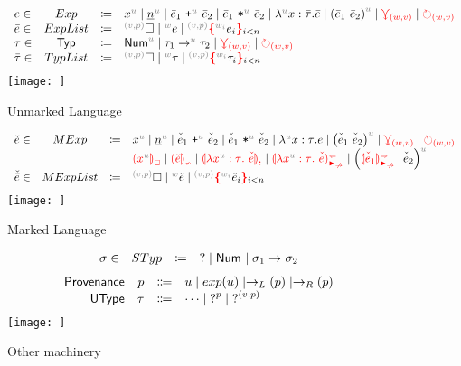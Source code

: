 \begin{figure}
    \[
    \begin{array}{lclll}
     \EMV \in & Exp & \coloneqq & 
        \var{x}
        \mid  \num 
        \mid \plus{\ELV_1}{\ELV_2} 
        \mid \mult{\ELV_1}{\ELV_2}
        \mid \lam{x}{\TLMV}{\ELV}
        \mid \app{\ELV_1}{\ELV_2}
        \mid \multiref
        \mid \uniref \\
     \ELV \in & ExpList & \coloneqq & 
        \ehole
        \mid \lexp{\EMV} 
        \mid \conflict{\EMV} \\
    \TMV \in & \Typ & \coloneqq & 
        \tnum 
        \mid \tarrow 
        \mid \multiref 
        \mid \uniref \\ 
    \TLMV \in & TypList & \coloneqq &
        \ehole
        \mid \lexp{\TMV}
        \mid \conflict{\TMV} \\
    \end{array}
    \]
    \centering
    \texttt{[image: ]}
    \caption{Unmarked Language}
    \label{fig:unmarked-language}
\end{figure}

\begin{figure}
    \[
    \begin{array}{lclll}
    \ECMV \in & MExp & \coloneqq &
        \var{x}
        \mid \num
        \mid \plus{\ELMV_1}{\ELMV_2}
        \mid \mult{\ELMV_1}{\ELMV_2}
        \mid \lam{x}{\TLMV}{\ELV}
        \mid \app{\ELMV_1}{\ELMV_2}
        \mid \multiref
        \mid \uniref \\ 
        & & & \ECFree{\var{x}} 
        \mid \incontype
        \mid \lamasc
        \mid \lamanamarr
        \mid \apsynmarr \\ 
     \ELMV \in & MExpList & \coloneqq &
        \ehole
        \mid \lexp{\ECMV}
        \mid \conflict{\ECMV} \\
    \end{array}
    \]
    \centering
    \texttt{[image: ]}
    \caption{Marked Language}
    \label{fig:marked-language}
\end{figure}

\begin{figure}
    \[
    \begin{array}{lclll}
    \sigma \in & STyp & \coloneqq & 
        \TUnknown
        \mid \tNum{}
        \mid \starrow \\
    \end{array}
    \]
    \judgbox{\graphErase{\TLMV} = \sigma}
    \[\begin{array}{rrcl}
        {\normalfont\textsf{Provenance}} & p & \Coloneqq & u \mid exp(u) \mid \rightarrow_L(p) \mid \rightarrow_R(p)\\
        {\normalfont\textsf{UType}}  & \tau  & \Coloneqq & \dots \mid \operatorname{?}^{p} \mid \operatorname{?}^{(v,p)}\\
    \end{array}\]
    \centering
    \texttt{[image: ]}
    \caption{Other machinery}
    \label{fig:marking-machinery}
\end{figure}



